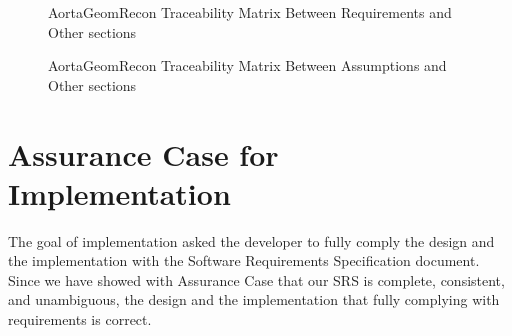 \begin{itemize}
\begin{figure}[H]
    \centering
    \caption[AortaGeomRecon Traceability Matrix Between Requirements and Other sections]{AortaGeomRecon Traceability Matrix Between Requirements and Other sections}
    \label{fig_agr_tm_im_r}
\end{figure}

\begin{figure}[H]
    \centering
    \caption[AortaGeomRecon Traceability Matrix Between Assumptions and Other sections]{AortaGeomRecon Traceability Matrix Between Assumptions and Other sections}
    \label{fig_agr_tm_a}
\end{figure}


\end{itemize}

\section{Assurance Case for Implementation}
The goal of implementation asked the developer to fully comply the design and the implementation with the Software Requirements Specification document. Since we have showed with Assurance Case that our SRS is complete, consistent, and unambiguous, the design and the implementation that fully complying with requirements is correct.

